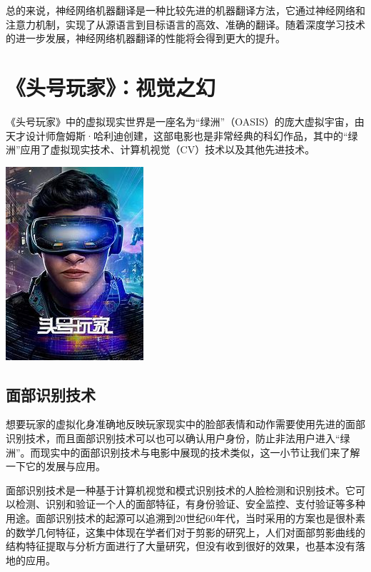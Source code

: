 总的来说，神经网络机器翻译是一种比较先进的机器翻译方法，它通过神经网络和注意力机制，实现了从源语言到目标语言的高效、准确的翻译。随着深度学习技术的进一步发展，神经网络机器翻译的性能将会得到更大的提升。

\section{《头号玩家》：视觉之幻}
《头号玩家》中的虚拟现实世界是一座名为“绿洲”（OASIS）的庞大虚拟宇宙，由天才设计师詹姆斯·哈利迪创建，这部电影也是非常经典的科幻作品，其中的“绿洲”应用了虚拟现实技术、计算机视觉（CV）技术以及其他先进技术。

\begin{marginfigure}
    \includegraphics{images/tech_7.png}
\end{marginfigure}

\subsection{面部识别技术}

想要玩家的虚拟化身准确地反映玩家现实中的脸部表情和动作需要使用先进的面部识别技术，而且面部识别技术可以也可以确认用户身份，防止非法用户进入“绿洲”。而现实中的面部识别技术与电影中展现的技术类似，这一小节让我们来了解一下它的发展与应用。

面部识别技术是一种基于计算机视觉和模式识别技术的人脸检测和识别技术。它可以检测、识别和验证一个人的面部特征，有身份验证、安全监控、支付验证等多种用途。面部识别技术的起源可以追溯到20世纪60年代，当时采用的方案也是很朴素的数学几何特征，这集中体现在学者们对于剪影的研究上，人们对面部剪影曲线的结构特征提取与分析方面进行了大量研究，但没有收到很好的效果，也基本没有落地的应用。


